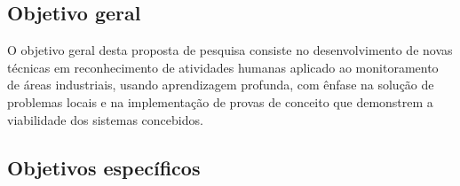 % 
%

\subsection{Objetivo geral}
O objetivo geral desta proposta de pesquisa consiste no desenvolvimento de novas técnicas em reconhecimento de atividades humanas aplicado ao monitoramento de áreas industriais, usando aprendizagem profunda, com ênfase na solução de problemas locais e na implementação de provas de conceito que demonstrem a viabilidade dos sistemas concebidos.

\subsection{Objetivos específicos} %
